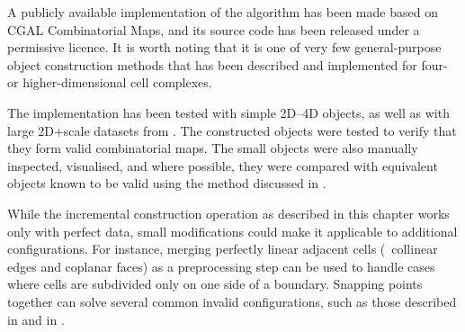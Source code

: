 A publicly available implementation of the algorithm has been made based on CGAL Combinatorial Maps, and its source code has been released under a permissive licence.
It is worth noting that it is one of very few general-purpose object construction methods that has been described and implemented for four- or higher-dimensional cell complexes.

The implementation has been tested with simple 2D--4D objects, as well as with large 2D+scale datasets from \citet{Meijers11}.
The constructed objects were tested to verify that they form valid combinatorial maps.
The small objects were also manually inspected, visualised, and where possible, they were compared with equivalent objects known to be valid using the method discussed in .

While the incremental construction operation as described in this chapter works only with perfect data, small modifications could make it applicable to additional configurations.
For instance, merging perfectly linear adjacent cells (\eg\ collinear edges and coplanar faces) as a preprocessing step can be used to handle cases where cells are subdivided only on one side of a boundary.
Snapping points together can solve several common invalid configurations, such as those described in  and in \citet{Diakite14}.
